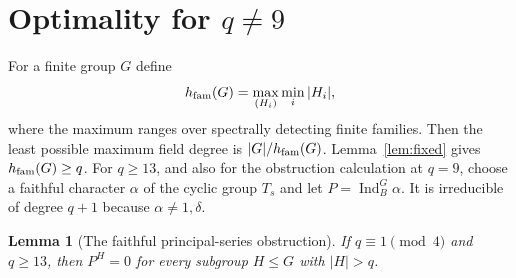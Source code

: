 \documentclass[11pt]{article}
\newtheorem{lemma}[theorem]{Lemma}
\theoremstyle{remark}\newtheorem{remark}[theorem]{Remark}
\newcommand{\Ind}{\operatorname{Ind}}
\begin{document}
\section{Optimality for \texorpdfstring{$q\ne9$}{q different from 9}}
For a finite group $G$ define
\[
 h_{\rm fam}(G)=\max_{(H_i)}\min_i|H_i|,
\]
where the maximum ranges over spectrally detecting finite families.
Then the least possible maximum field degree is $|G|/h_{\rm fam}(G)$.
Lemma~\ref{lem:fixed} gives $h_{\rm fam}(G)\ge q$.
For $q\ge13$, and also for the obstruction calculation at $q=9$, choose
a faithful character $\alpha$ of the cyclic group $T_s$ and let
$P=\Ind_B^G\alpha$. It is irreducible of degree $q+1$ because
$\alpha\ne1,\delta$.

\begin{lemma}[The faithful principal-series obstruction]\label{lem:obstruction}
If $q\equiv1\pmod4$ and $q\ge13$, then $P^H=0$ for every subgroup
$H\le G$ with $|H|>q$.
\end{lemma}
\end{document}
